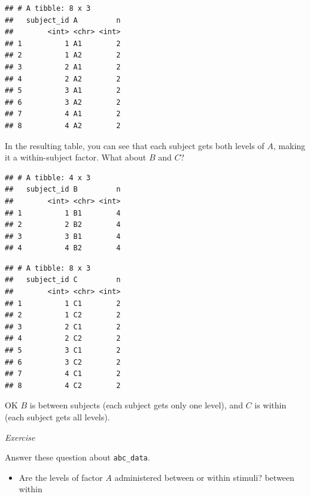 \documentclass[]{book}
\newenvironment{Shaded}{\begin{snugshade}}{\end{snugshade}}
\newcommand{\KeywordTok}[1]{\textcolor[rgb]{0.13,0.29,0.53}{\textbf{#1}}}
\newcommand{\NormalTok}[1]{#1}
\newcommand{\OperatorTok}[1]{\textcolor[rgb]{0.81,0.36,0.00}{\textbf{#1}}}
\newcommand{\StringTok}[1]{\textcolor[rgb]{0.31,0.60,0.02}{#1}}
\providecommand{\tightlist}{%
  \setlength{\itemsep}{0pt}\setlength{\parskip}{0pt}}
\begin{document}
\begin{verbatim}
## # A tibble: 8 x 3
##   subject_id A         n
##        <int> <chr> <int>
## 1          1 A1        2
## 2          1 A2        2
## 3          2 A1        2
## 4          2 A2        2
## 5          3 A1        2
## 6          3 A2        2
## 7          4 A1        2
## 8          4 A2        2
\end{verbatim}

In the resulting table, you can see that each subject gets both levels of \(A\), making it a within-subject factor. What about \(B\) and \(C\)?

\begin{Shaded}
\end{Shaded}

\begin{verbatim}
## # A tibble: 4 x 3
##   subject_id B         n
##        <int> <chr> <int>
## 1          1 B1        4
## 2          2 B2        4
## 3          3 B1        4
## 4          4 B2        4
\end{verbatim}

\begin{Shaded}
\end{Shaded}

\begin{verbatim}
## # A tibble: 8 x 3
##   subject_id C         n
##        <int> <chr> <int>
## 1          1 C1        2
## 2          1 C2        2
## 3          2 C1        2
## 4          2 C2        2
## 5          3 C1        2
## 6          3 C2        2
## 7          4 C1        2
## 8          4 C2        2
\end{verbatim}

OK \(B\) is between subjects (each subject gets only one level), and \(C\) is within (each subject gets all levels).

\emph{Exercise}

Answer these question about \texttt{abc\_data}.

\begin{itemize}
\tightlist
\item
  Are the levels of factor \(A\) administered between or within stimuli? between within
\end{itemize}
\end{document}
